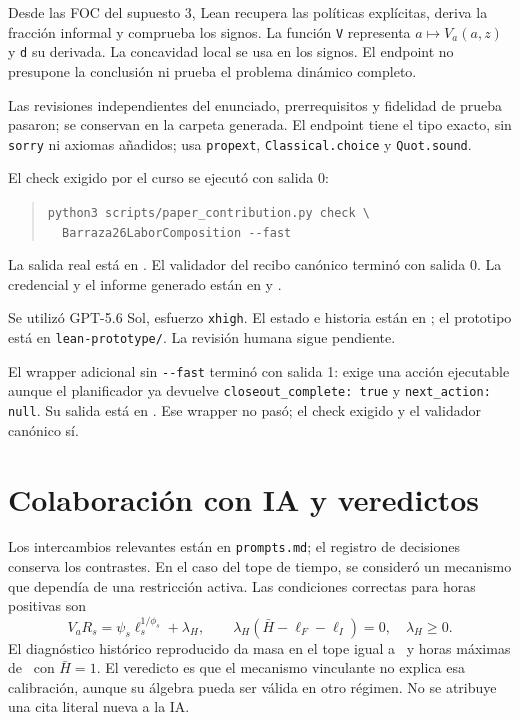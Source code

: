 \documentclass[11pt]{article}
\theoremstyle{definition}
\newcommand{\Va}{V_a}
\begin{document}
Desde las FOC del supuesto 3, Lean recupera las políticas explícitas, deriva la fracción informal y comprueba los signos. La función \texttt{V} representa \(a\mapsto\Va(a,z)\) y \texttt{d} su derivada. La concavidad local se usa en los signos. El endpoint no presupone la conclusión ni prueba el problema dinámico completo.

Las revisiones independientes del enunciado, prerrequisitos y fidelidad de prueba pasaron; se conservan en la carpeta generada. El endpoint tiene el tipo exacto, sin \texttt{sorry} ni axiomas añadidos; usa \texttt{propext}, \texttt{Classical.choice} y \texttt{Quot.sound}.

El check exigido por el curso se ejecutó con salida 0:
\begin{quote}\small
\texttt{python3 scripts/paper\_contribution.py check \textbackslash}\\
\texttt{\ \ Barraza26LaborComposition -{}-fast}
\end{quote}
La salida real está en . El validador del recibo canónico terminó con salida 0. La credencial y el informe generado están en  y .

Se utilizó GPT-5.6 Sol, esfuerzo \texttt{xhigh}. El estado e historia están en ; el prototipo está en \texttt{lean-prototype/}. La revisión humana sigue pendiente.

El wrapper adicional sin \texttt{-{}-fast} terminó con salida 1: exige una acción ejecutable aunque el planificador ya devuelve \texttt{closeout\_complete: true} y \texttt{next\_action: null}. Su salida está en . Ese wrapper no pasó; el check exigido y el validador canónico sí.

\section{Colaboración con IA y veredictos}
Los intercambios relevantes están en \texttt{prompts.md}; el registro de decisiones conserva los contrastes. En el caso del tope de tiempo, se consideró un mecanismo que dependía de una restricción activa. Las condiciones correctas para horas positivas son
\[
\Va R_s=\psi_s\ell_s^{1/\phi_s}+\lambda_H,\qquad
\lambda_H(\bar H-\ell_F-\ell_I)=0,\quad\lambda_H\geq0.
\]
El diagnóstico histórico reproducido da masa en el tope igual a \PENoCap\ y horas máximas de \PEMaxHours\ con \(\bar H=1\). El veredicto es que el mecanismo vinculante no explica esa calibración, aunque su álgebra pueda ser válida en otro régimen. No se atribuye una cita literal nueva a la IA.
\end{document}
